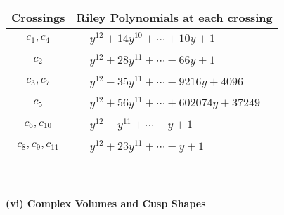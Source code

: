 \documentclass[1p]{elsarticle_modified}
\theoremstyle{definition}
\begin{document}
\begin{tabular}{m{50pt}|m{274pt}}
Crossings & \hspace{64pt}Riley Polynomials at each crossing \\
\hline $$\begin{aligned}c_{1},c_{4}\end{aligned}$$&$\begin{aligned}
&y^{12}+14 y^{10}+\cdots+10 y+1
\end{aligned}$\\
\hline $$\begin{aligned}c_{2}\end{aligned}$$&$\begin{aligned}
&y^{12}+28 y^{11}+\cdots-66 y+1
\end{aligned}$\\
\hline $$\begin{aligned}c_{3},c_{7}\end{aligned}$$&$\begin{aligned}
&y^{12}-35 y^{11}+\cdots-9216 y+4096
\end{aligned}$\\
\hline $$\begin{aligned}c_{5}\end{aligned}$$&$\begin{aligned}
&y^{12}+56 y^{11}+\cdots+602074 y+37249
\end{aligned}$\\
\hline $$\begin{aligned}c_{6},c_{10}\end{aligned}$$&$\begin{aligned}
&y^{12}- y^{11}+\cdots- y+1
\end{aligned}$\\
\hline $$\begin{aligned}c_{8},c_{9},c_{11}\end{aligned}$$&$\begin{aligned}
&y^{12}+23 y^{11}+\cdots- y+1
\end{aligned}$\\
\hline
\end{tabular}\\~\\
\newpage\flushleft \textbf{(vi) Complex Volumes and Cusp Shapes}
\end{document}
